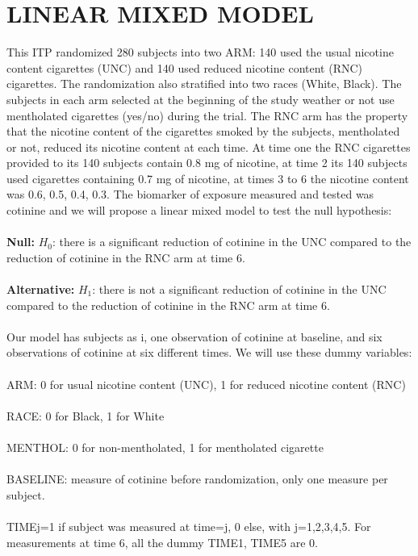 \documentclass[A4,12pt]{article}%
\begin{document}
\section*{LINEAR MIXED MODEL}
\noindent 

This ITP randomized 280 subjects into two ARM: 140 used the usual nicotine content cigarettes (UNC) and 140 used reduced nicotine content (RNC) cigarettes. The randomization also stratified into two races (White, Black). The subjects in each arm selected at the beginning  of the study weather or not use mentholated cigarettes (yes/no) during the trial. The RNC arm has the property that the nicotine content of the cigarettes smoked by the subjects, mentholated or not, reduced its nicotine content at each time. At time one the RNC cigarettes provided to its 140 subjects contain 0.8 mg of nicotine, at time 2 its 140 subjects used cigarettes containing 0.7 mg of nicotine, at times 3 to 6 the nicotine content was 0.6, 0.5, 0.4, 0.3. The biomarker of exposure measured and tested was cotinine and we will propose a linear mixed model to test the null hypothesis:
\\ \\
\textbf{Null:} $H_{0}$: there is a significant reduction of cotinine in the UNC compared to the reduction of cotinine in the RNC arm at time 6.
\\ \\
\textbf{Alternative:} $H_{1}$: there is not a significant reduction of cotinine in the UNC compared to the reduction of cotinine in the RNC arm at time 6.
\\ \\
Our model has subjects as i, one observation of cotinine at baseline, and six observations of cotinine at six different times. We will use these dummy variables:
\\ \\
ARM: 0 for usual nicotine content (UNC), 1 for reduced nicotine content (RNC)
\\ \\
RACE: 0 for Black, 1 for White
\\ \\
MENTHOL: 0 for non-mentholated, 1 for mentholated cigarette
\\ \\
BASELINE: measure of cotinine before randomization, only one measure per subject.
\\ \\
TIMEj=1 if subject was measured at time=j, 0 else, with j=1,2,3,4,5. For measurements at time 6, all the dummy TIME1, TIME5 are 0.
\end{document}
